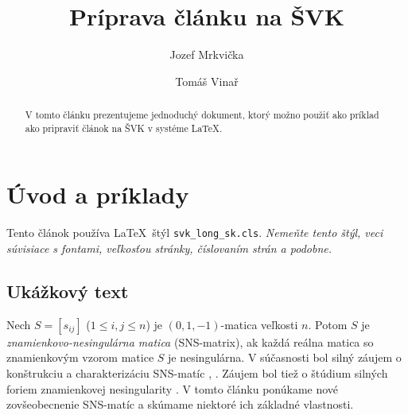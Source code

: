 \documentclass{svk_long_sk}
\begin{document}
\title{Príprava článku na ŠVK}

\author{Jozef Mrkvička
\and 
Tomáš Vinař
}




\maketitle

\begin{abstract}
V tomto článku prezentujeme jednoduchý dokument, ktorý
možno použiť ako príklad ako pripraviť článok na ŠVK
v systéme \LaTeX.

\end{abstract}

\section{Úvod a príklady}

Tento článok používa \LaTeX\ štýl {\tt svk\_long\_sk.cls}.
\emph{Nemeňte tento štýl, veci súvisiace s fontami,
veľkosťou stránky, číslovaním strán a podobne.}

\subsection{Ukážkový text}
Nech $S=[s_{ij}]$ ($1\leq i,j\leq n$) je $(0,1,-1)$-matica
veľkosti $n$. Potom $S$ je {\em znamienkovo-nesingulárna matica}
(SNS-matrix), ak každá reálna matica so znamienkovým vzorom
matice $S$ je nesingulárna. V súčasnosti bol silný záujem
o konštrukciu a charakterizáciu
SNS-matíc \cite{bs}, \cite{klm}. Záujem bol tiež o štúdium silných foriem
znamienkovej nesingularity \cite{djd}. V tomto článku ponúkame
nové zovšeobecnenie SNS-matíc a skúmame niektoré ich základné vlastnosti.
 
\end{document}

